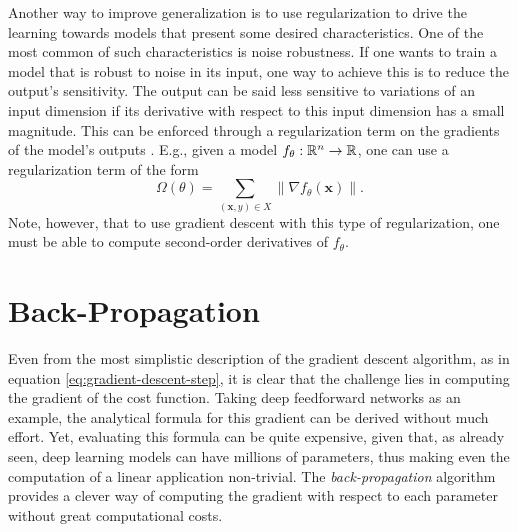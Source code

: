 Another way to improve generalization is to use regularization to drive the learning towards models that present some desired characteristics.
One of the most common of such characteristics is noise robustness.
If one wants to train a model that is robust to noise in its input, one way to achieve this is to reduce the output's sensitivity.
The output can be said less sensitive to variations of an input dimension if its derivative with respect to this input dimension has a small magnitude.
This can be enforced through a regularization term on the gradients of the model's outputs \cite{drucker_improving_1992}.
E.g., given a model $f_\theta:\mathbb{R}^n\to\mathbb{R}$, one can use a regularization term of the form \[
    \Omega\left( \theta \right) = \sum_{\left( \bm{x},y \right) \in X} \| \nabla f_\theta\left( \bm{x} \right) \|
.\] Note, however, that to use gradient descent with this type of regularization, one must be able to compute second-order derivatives of $f_\theta$.

\section{Back-Propagation}

Even from the most simplistic description of the gradient descent algorithm, as in equation \eqref{eq:gradient-descent-step}, it is clear that the challenge lies in computing the gradient of the cost function.
Taking deep feedforward networks as an example, the analytical formula for this gradient can be derived without much effort.
Yet, evaluating this formula can be quite expensive, given that, as already seen, deep learning models can have millions of parameters, thus making even the computation of a linear application non-trivial.
The \emph{back-propagation} algorithm \cite{rumelhart_learning_1986} provides a clever way of computing the gradient with respect to each parameter without great computational costs.

